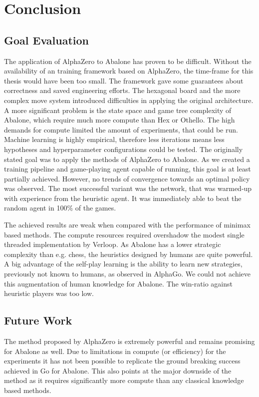 \chapter{Conclusion}
\label{conclusion}

\section{Goal Evaluation}
The application of AlphaZero to Abalone has proven to be difficult. Without the availability of an training framework based on AlphaZero, the time-frame for this thesis would have been too small. The framework gave some guarantees about correctness and saved engineering efforts. The hexagonal board and the more complex move system introduced difficulties in applying the original architecture. A more significant problem is the state space and game tree complexity of Abalone, which require much more compute than Hex or Othello. The high demands for compute limited the amount of experiments, that could be run. Machine learning is highly empirical, therefore less iterations means less hypotheses and hyperparameter configurations could be tested. The originally stated goal was to apply the methods of AlphaZero to Abalone. As  we created a training pipeline and game-playing agent capable of running, this goal is at least partially achieved. However, no trends of convergence towards an optimal policy was observed. The most successful variant was the network, that was warmed-up with experience from the heuristic agent. It was immediately able to beat the random agent in 100\% of the games.

The achieved results are weak when compared with the performance of minimax based methods. The compute resources required overshadow the modest single threaded implementation by Verloop. As Abalone has a lower strategic complexity than e.g. chess, the heuristics designed by humans are quite powerful. A big advantage of the self-play learning is the ability to learn new strategies, previously not known to humans, as observed in AlphaGo. We could not achieve this augmentation of human knowledge for Abalone. The win-ratio against heuristic players was too low.

\section{Future Work}
The method proposed by AlphaZero is extremely powerful and remains promising for Abalone as well. Due to limitations in compute (or efficiency) for the experiments it has not been possible to replicate the ground breaking success achieved in Go for Abalone. This also points at the major downside of the method as it requires significantly more compute than any classical knowledge based methods.


